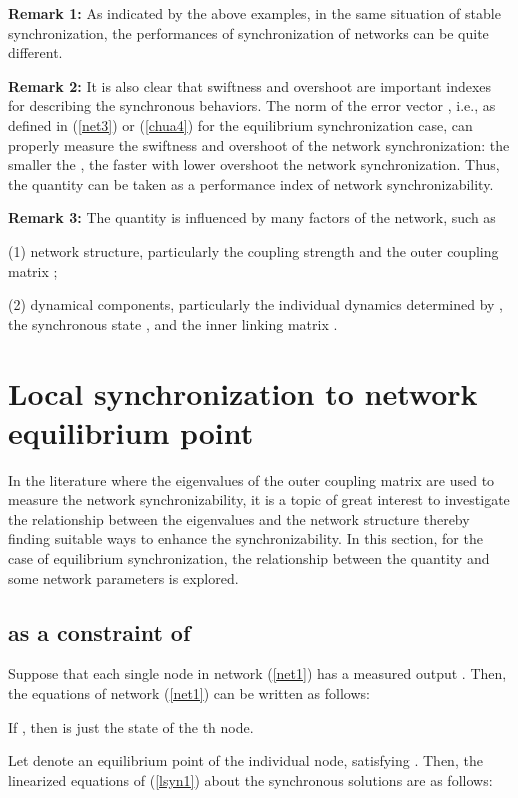 \documentclass[11pt]{article}
\def\dref#1{(\ref{#1})}
\begin{document}
\textbf{Remark 1:} As indicated by the above examples, in the same
situation of stable synchronization, the performances of
synchronization of networks can be quite different.

\textbf{Remark 2:} It is also clear that swiftness and overshoot are
important indexes for describing the synchronous behaviors. The
 norm of the error vector , i.e.,  as defined in
\dref{net3} or \dref{chua4} for the equilibrium synchronization
case, can properly measure the swiftness and overshoot of the
network synchronization: the smaller the , the faster with
lower overshoot the network synchronization. Thus, the quantity
 can be taken as a performance index of network
synchronizability.

\textbf{Remark 3:} The quantity  is influenced by many
factors of the network, such as

(1) network structure, particularly the coupling strength 
and the outer coupling matrix ;

(2) dynamical components, particularly the individual dynamics
determined by , the synchronous state , and the inner
linking matrix .

\section{Local synchronization to network equilibrium point}

\quad In the literature where the eigenvalues of the outer coupling
matrix are used to measure the network synchronizability, it is a
topic of great interest to investigate the relationship between the
eigenvalues and the network structure thereby finding suitable ways
to enhance the synchronizability. In this section, for the case of
equilibrium synchronization, the relationship between the quantity
 and some network parameters is explored.


\subsection{ as a constraint of }

\quad Suppose that each single node in network \dref{net1} has a
measured output . Then, the equations of network \dref{net1}
can be written as follows:

If , then  is just the state of the th node.

Let  denote an equilibrium point of the individual node,
satisfying . Then, the linearized equations of \dref{lsyn1} about the
synchronous solutions  are as follows:
\end{document}
